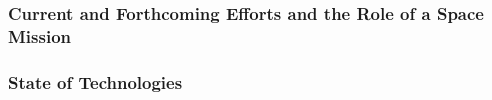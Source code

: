 \documentclass[12pt]{article}
\def\microkrtsec{$\mu{\mbox{K}}\sqrt{\mbox{sec}}$}
\begin{document}
\vspace{-0.05in}

\subsubsection{Current and Forthcoming Efforts and the Role of a Space Mission}
\label{sec:spacemission}

\vspace{-0.22in}

\subsubsection{State of Technologies}
\label{sec:technologies}

\vspace{-0.05in}

\end{document}
